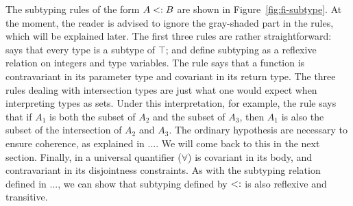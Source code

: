 

The subtyping rules of the form $A <: B$ are shown in 
Figure~\ref{fig:fi-subtype}. 
At the moment, the reader is advised to ignore the
gray-shaded part in the rules, which will be explained later. 
The first three rules are rather straightforward: 
says that every type is a subtype of $\top$;  and 
 define subtyping as a reflexive relation on integers and
type variables.
The rule  says that a function is contravariant in 
its parameter type and covariant in its return type. 
The three rules dealing with intersection types are just what one would expect 
when interpreting types as sets. 
Under this interpretation, for example, the rule 
says that if $A_1$ is both the subset of $A_2$ and the subset of $A_3$, then
$A_1$ is also the subset of the intersection of $A_2$ and $A_3$.
The ordinary hypothesis are necessary to ensure coherence, as explained in ....
We will come back to this in the next section.
Finally, in  a universal quantifier ($\forall$) 
is covariant in its body, and contravariant in its disjointness constraints.
As with the subtyping relation defined in ..., we can show that subtyping
defined by $<:$ is also reflexive and transitive.


%
%

